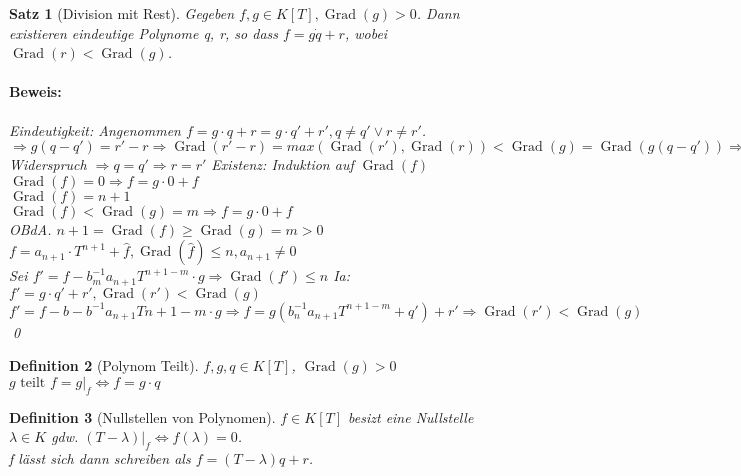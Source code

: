 \documentclass{report}
\newcommand{\lb}{\lambda}
\DeclareMathOperator{\Grad}{Grad}
\theoremstyle{customrem}
\theoremstyle{customdef}
\newtheorem{definition}{Definition}[chapter]
\newtheorem{satz}[definition]{Satz}
\renewenvironment{proof}{\paragraph{Beweis: }}{\qed}
\theoremstyle{customenv}
\begin{document}
\begin{satz}[Division mit Rest]
  Gegeben \(f, g \in K[T], \Grad(g) > 0\). Dann existieren eindeutige 
  Polynome q, r, so dass \(f = g \dot q + r\), wobei \(\Grad(r) < \Grad(g)\).
  \begin{proof}
    Eindeutigkeit: Angenommen
    \(f = g \cdot q + r = g \cdot q' + r', q \neq q' \lor r \neq r'\).\\
    \(
      \Rightarrow g(q - q') = r' - r
      \Rightarrow \Grad(r' - r) = max(\Grad(r'), \Grad(r)) < \Grad(g)
                  = \Grad(g(q - q'))
      \Rightarrow\) Widerspruch \(
      \Rightarrow q = q' \Rightarrow r = r'
    \)
    Existenz: Induktion auf \(\Grad(f)\)\\
    \(\Grad(f) = 0 \Rightarrow f = g \cdot 0 + f\)\\
    \(\Grad(f) = n + 1\)\\
    \(\Grad(f) < \Grad(g) = m \Rightarrow f = g \cdot 0 + f\)\\
    OBdA. \(n + 1 = \Grad(f) \ge \Grad(g) = m > 0\)\\
    \(f = a_{n + 1} \cdot T^{n+1} + \hat{f},
    \Grad(\hat{f}) \le n, a_{n + 1} \neq 0\)\\
    Sei \(
      f' = f - b_m^{-1} a_{n+1}T^{n+1-m} \cdot g \Rightarrow \Grad(f') \le n
    \)
    Ia: \(f' = g \cdot q' + r', \Grad(r') < \Grad(g)\)\\
    \(
      f' = f - b-b^{-1}a_{n+1}T{n + 1 - m} \cdot g
      \Rightarrow f = g(b_n^{-1}a_{n+1}T^{n+1-m} +q')+r'
      \Rightarrow \Grad(r') < \Grad(g)
    \)
  \end{proof}
\end{satz}

\begin{definition}[Polynom Teilt]
  \(f, g, q \in K[T]\), \(\Grad(g) > 0\)\\
  \(g \text{ teilt } f  = g|_f\Leftrightarrow f = g \cdot q\)\\
\end{definition}

\begin{definition}[Nullstellen von Polynomen]
  \(f \in K[T]\) besizt eine Nullstelle \(\lb \in K\) gdw.
  \((T - \lb) |_f \Leftrightarrow f(\lb) = 0\).\\
  f l\"asst sich dann schreiben als \(f = (T - \lb)q + r\).
\end{definition}
\end{document}
